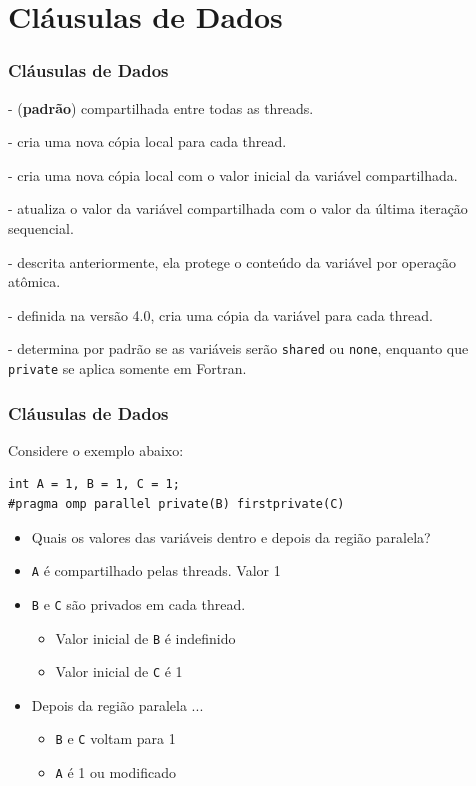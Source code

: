 \documentclass[xcolor={usenames,dvipsnames},12pt,presentation,aspectratio=169]{beamer}
\begin{document}
\section{Cláusulas de Dados}
\begin{frame}
  \frametitle{Cláusulas de Dados}
  \begin{description}[<+->]
  \item[shared] - (\textbf{padrão}) compartilhada entre todas as threads.
  \item[private] - cria uma nova cópia local para cada thread.
  \item[firstprivate] - cria uma nova cópia local com o valor inicial da variável compartilhada.
  \item[lastprivate] - atualiza o valor da variável compartilhada com o valor da última iteração sequencial.
  \item[reduction] - descrita anteriormente, ela protege o conteúdo da variável por operação atômica.
  \item[threadprivate] - definida na versão 4.0, cria uma cópia da variável para cada thread.
  \item[default]  - determina por padrão se as variáveis serão \texttt{shared} ou \texttt{none}, enquanto
    que \texttt{private} se aplica somente em Fortran.
  \end{description}
\end{frame}
\begin{frame}[fragile]
  \frametitle{Cláusulas de Dados}
Considere o exemplo abaixo:
\begin{minipage}{0.95\textwidth}  
\begin{verbatim}  
int A = 1, B = 1, C = 1;
#pragma omp parallel private(B) firstprivate(C)
\end{verbatim}
\end{minipage}
%
\begin{itemize}[<+->]
  \item Quais os valores das variáveis dentro e depois da região paralela?
  \item \texttt{A} é compartilhado pelas threads. Valor 1
  \item \texttt{B} e \texttt{C} são privados em cada thread.
  \begin{itemize}
    \item Valor inicial de \texttt{B} é indefinido
    \item Valor inicial de \texttt{C} é 1
  \end{itemize}      
  \item Depois da região paralela ...
  \begin{itemize}
    \item \texttt{B} e \texttt{C} voltam para 1
    \item \texttt{A} é 1 ou modificado
  \end{itemize}      
\end{itemize}
\end{frame}
\end{document}
